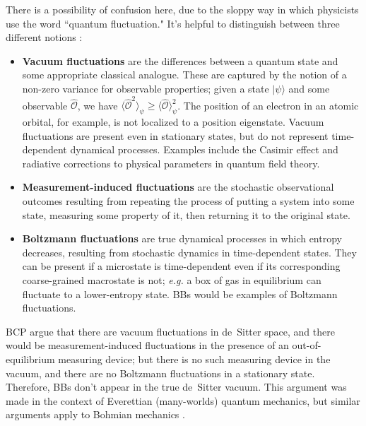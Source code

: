 \documentclass[12pt,letterpaper]{article}
\newcommand{\calo}{{\mathcal O}}
\begin{document}
There is a possibility of confusion here, due to the sloppy way in which physicists use the word ``quantum fluctuation."
It's helpful to distinguish between three different notions \cite{Boddy:2015fqa}:
\begin{itemize}
\item{\bf Vacuum fluctuations} are the differences between a quantum state and some appropriate classical analogue. These are captured by the notion of a non-zero variance for observable properties; given a state $|\psi\rangle$ and some observable $\widehat\calo$, we have $\langle\widehat\calo^2\rangle_\psi\geq \langle\widehat\calo\rangle^2_\psi$. The position of an electron in an atomic orbital, for example, is not localized to a position eigenstate. Vacuum fluctuations are present even in stationary states, but do not represent time-dependent dynamical processes. Examples include the Casimir effect and radiative corrections to physical parameters in quantum field theory.
\item{\bf Measurement-induced fluctuations} are the stochastic observational outcomes resulting from repeating the process of putting a system into some state, measuring some property of it, then returning it to the original state. 
\item{\bf Boltzmann fluctuations} are true dynamical processes in which entropy decreases, resulting from stochastic dynamics in time-dependent states. They can be present if a microstate is time-dependent even if its corresponding coarse-grained macrostate is not; {\it e.g.} a box of gas in equilibrium can fluctuate to a lower-entropy state. BBs would be examples of Boltzmann fluctuations.
\end{itemize}
BCP argue that there are vacuum fluctuations in de~Sitter space, and there would be measurement-induced fluctuations in the presence of an out-of-equilibrium measuring device; but there is no such measuring device in the vacuum, and there are no Boltzmann fluctuations in a stationary state.
Therefore, BBs don't appear in the true de~Sitter vacuum.
This argument was made in the context of Everettian (many-worlds) quantum mechanics, but similar arguments apply to Bohmian mechanics \cite{Goldstein:2015mha}.
\end{document}
